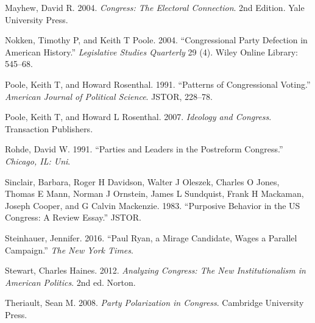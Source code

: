 \documentclass[12pt,twoside]{reedthesis}
\begin{document}
  \hypertarget{ref-Mayhew2004}{}
  Mayhew, David R. 2004. \emph{Congress: The Electoral Connection}. 2nd
  Edition. Yale University Press.
  
  \hypertarget{ref-Nokken2004}{}
  Nokken, Timothy P, and Keith T Poole. 2004. ``Congressional Party
  Defection in American History.'' \emph{Legislative Studies Quarterly} 29
  (4). Wiley Online Library: 545--68.
  
  \hypertarget{ref-Poole1991}{}
  Poole, Keith T, and Howard Rosenthal. 1991. ``Patterns of Congressional
  Voting.'' \emph{American Journal of Political Science}. JSTOR, 228--78.
  
  \hypertarget{ref-Poole2007}{}
  Poole, Keith T, and Howard L Rosenthal. 2007. \emph{Ideology and
  Congress}. Transaction Publishers.
  
  \hypertarget{ref-Rohde1991}{}
  Rohde, David W. 1991. ``Parties and Leaders in the Postreform
  Congress.'' \emph{Chicago, IL: Uni}.
  
  \hypertarget{ref-Sinclair1983}{}
  Sinclair, Barbara, Roger H Davidson, Walter J Oleszek, Charles O Jones,
  Thomas E Mann, Norman J Ornstein, James L Sundquist, Frank H Mackaman,
  Joseph Cooper, and G Calvin Mackenzie. 1983. ``Purposive Behavior in the
  US Congress: A Review Essay.'' JSTOR.
  
  \hypertarget{ref-Steinhauer2016}{}
  Steinhauer, Jennifer. 2016. ``Paul Ryan, a Mirage Candidate, Wages a
  Parallel Campaign.'' \emph{The New York Times}.
  
  \hypertarget{ref-Stewart2012}{}
  Stewart, Charles Haines. 2012. \emph{Analyzing Congress: The New
  Institutionalism in American Politics}. 2nd ed. Norton.
  
  \hypertarget{ref-Theriault2008}{}
  Theriault, Sean M. 2008. \emph{Party Polarization in Congress}.
  Cambridge University Press.


\end{document}
